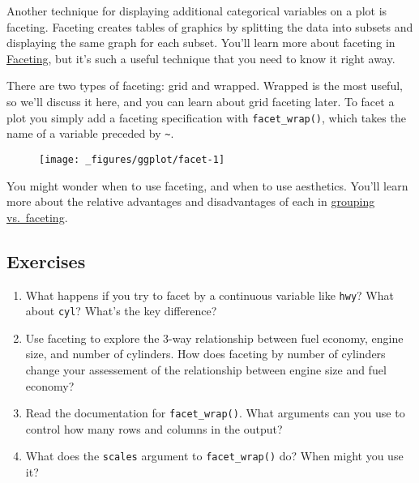Another technique for displaying additional categorical variables on a
plot is faceting. Faceting creates tables of graphics by splitting the
data into subsets and displaying the same graph for each subset. You'll
learn more about faceting in \hyperref[sec:faceting]{Faceting}, but it's
such a useful technique that you need to know it right away.

There are two types of faceting: grid and wrapped. Wrapped is the most
useful, so we'll discuss it here, and you can learn about grid faceting
later. To facet a plot you simply add a faceting specification with
\texttt{facet\_wrap()}, which takes the name of a variable preceded by
\texttt{\textasciitilde{}}. 

\begin{Shaded}
\begin{Highlighting}[]
\StringTok{ }
\StringTok{  }\NormalTok{() +}\StringTok{ }
\StringTok{  }
\end{Highlighting}
\end{Shaded}

\begin{figure}[H]
  \texttt{[image: \_figures/ggplot/facet-1]}
\end{figure}

You might wonder when to use faceting, and when to use aesthetics.
You'll learn more about the relative advantages and disadvantages of
each in \hyperref[sub:group-vs-facet]{grouping vs.~faceting}.

\subsection{Exercises}

\begin{enumerate}
\def\labelenumi{\arabic{enumi}.}
\item
  What happens if you try to facet by a continuous variable like
  \texttt{hwy}? What about \texttt{cyl}? What's the key difference?
\item
  Use faceting to explore the 3-way relationship between fuel economy,
  engine size, and number of cylinders. How does faceting by number of
  cylinders change your assessement of the relationship between engine
  size and fuel economy?
\item
  Read the documentation for \texttt{facet\_wrap()}. What arguments can
  you use to control how many rows and columns in the output?
\item
  What does the \texttt{scales} argument to \texttt{facet\_wrap()} do?
  When might you use it?
\end{enumerate}

